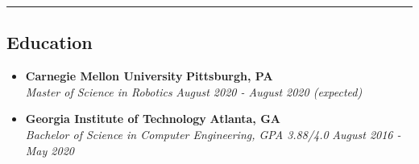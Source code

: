 \vspace{-0.5em}
\hrule
\vspace{-1em}
\subsection*{Education}
\ifx\rxucv\undefined
\vspace{-1em}
\fi

\begin{itemize}[label={},leftmargin=1em]
	\parskip=0.1em

	\item 
	\headerrow
		{\textbf{Carnegie Mellon University}}
		{\textbf{Pittsburgh, PA}}
	\\
	\headerrow
		{\emph{Master of Science in Robotics}}
		{\emph{August 2020 - August 2020 (expected)}}
	\vspace{-1.3em}

	\ifx\rxucv\undefined
	\vspace{-1em}
	\fi

	\item
	\headerrow
		{\textbf{Georgia Institute of Technology}}
		{\textbf{Atlanta, GA}}
	\\
	\headerrow
		{\emph{Bachelor of Science in Computer Engineering, GPA 3.88/4.0}}
		{\emph{August 2016 - May 2020}}
	\vspace{-1.3em}

\end{itemize}
